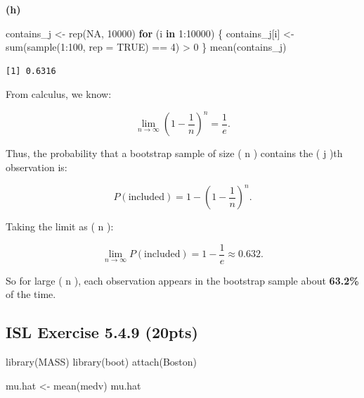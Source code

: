 \documentclass[
  letterpaper,
  DIV=11,
  numbers=noendperiod]{scrartcl}
\newenvironment{Shaded}{\begin{snugshade}}{\end{snugshade}}
\newcommand{\AttributeTok}[1]{\textcolor[rgb]{0.40,0.45,0.13}{#1}}
\newcommand{\ConstantTok}[1]{\textcolor[rgb]{0.56,0.35,0.01}{#1}}
\newcommand{\ControlFlowTok}[1]{\textcolor[rgb]{0.00,0.23,0.31}{\textbf{#1}}}
\newcommand{\DecValTok}[1]{\textcolor[rgb]{0.68,0.00,0.00}{#1}}
\newcommand{\FunctionTok}[1]{\textcolor[rgb]{0.28,0.35,0.67}{#1}}
\newcommand{\NormalTok}[1]{\textcolor[rgb]{0.00,0.23,0.31}{#1}}
\newcommand{\OtherTok}[1]{\textcolor[rgb]{0.00,0.23,0.31}{#1}}
\newcommand{\SpecialCharTok}[1]{\textcolor[rgb]{0.37,0.37,0.37}{#1}}
\begin{document}
\textbf{(h)}

\begin{Shaded}
\begin{Highlighting}[]
\NormalTok{contains\_j }\OtherTok{\textless{}{-}} \FunctionTok{rep}\NormalTok{(}\ConstantTok{NA}\NormalTok{, }\DecValTok{10000}\NormalTok{)}
\ControlFlowTok{for}\NormalTok{ (i }\ControlFlowTok{in} \DecValTok{1}\SpecialCharTok{:}\DecValTok{10000}\NormalTok{) \{}
\NormalTok{    contains\_j[i] }\OtherTok{\textless{}{-}} \FunctionTok{sum}\NormalTok{(}\FunctionTok{sample}\NormalTok{(}\DecValTok{1}\SpecialCharTok{:}\DecValTok{100}\NormalTok{, }\AttributeTok{rep =} \ConstantTok{TRUE}\NormalTok{) }\SpecialCharTok{==} \DecValTok{4}\NormalTok{) }\SpecialCharTok{\textgreater{}} \DecValTok{0}
\NormalTok{\}}
\FunctionTok{mean}\NormalTok{(contains\_j)}
\end{Highlighting}
\end{Shaded}

\begin{verbatim}
[1] 0.6316
\end{verbatim}

From calculus, we know:

\[
\lim_{n\rightarrow\infty}\left(1 - \frac{1}{n}\right)^n = \frac{1}{e}.
\]

Thus, the probability that a bootstrap sample of size ( n ) contains the
( j )th observation is:

\[
P(\text{included}) = 1 - \left(1 - \frac{1}{n}\right)^n.
\]

Taking the limit as ( n \to \infty ):

\[
\lim_{n \to \infty} P(\text{included}) = 1 - \frac{1}{e} \approx 0.632.
\]

So for large ( n ), each observation appears in the bootstrap sample
about \textbf{63.2\%} of the time.

\subsection{ISL Exercise 5.4.9 (20pts)}\label{isl-exercise-5.4.9-20pts}

\begin{Shaded}
\begin{Highlighting}[]
\FunctionTok{library}\NormalTok{(MASS)}
\FunctionTok{library}\NormalTok{(boot)}
\FunctionTok{attach}\NormalTok{(Boston)}
\end{Highlighting}
\end{Shaded}

\begin{Shaded}
\begin{Highlighting}[]
\NormalTok{mu.hat }\OtherTok{\textless{}{-}} \FunctionTok{mean}\NormalTok{(medv)}
\NormalTok{mu.hat}
\end{Highlighting}
\end{Shaded}
\end{document}
